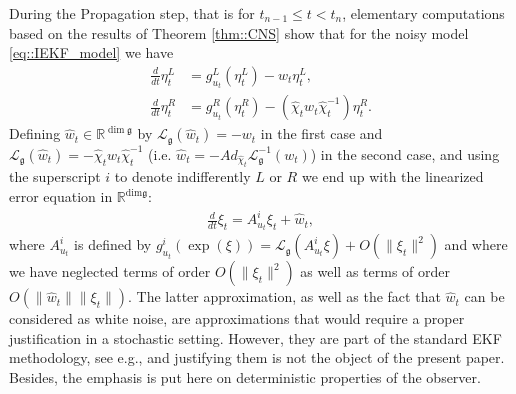 \documentclass[a4paper,12pt,onecolumn]{article}
\newcommand{\RR}{{\mathbb{R}}}
\newcommand{\norm}[1]{\lVert#1\rVert}
\newcommand{\dotex}{{\frac{d}{dt}}}
\begin{document}
During the Propagation step, that is for $t_{n-1}\leq t<t_n$, elementary computations based on the results of Theorem \ref{thm::CNS} show that for the noisy model \eqref{eq::IEKF_model} we have
\begin{equation}
\begin{aligned}
\dotex\eta_t^L &  = g_{u_t}^L \left( \eta_t^L \right) - w_t\eta_t^L, \\
 \dotex\eta_t^R & = g_{u_t}^R \left( \eta_t^R \right) - \left( \hat \chi_t w_t \hat \chi_t^{-1} \right) \eta_t^R.
\end{aligned}
\label{er_r:eq}
\end{equation}
Defining $\hat{w}_t \in \RR^{\dim \mathfrak{g}}$ by $\mathcal{L}_{\mathfrak{g}}(\hat{w}_t) = - w_t$ in the first case and $\mathcal{L}_{\mathfrak{g}}(\hat{w}_t) = -\hat\chi_tw_t\hat\chi_t^{-1}$ (i.e. $\hat{w}_t = - Ad_{\hat{\chi}_t} \mathcal{L}_{\mathfrak{g}}^{-1} (w_t)$) in the second case, and using the superscript $i$ to denote indifferently $L$ or $R$ we end up with the linearized error equation in $\RR^{\mathrm{dim }\mathfrak{g}}$: 
\begin{align}
\frac{d}{dt} \xi_t = A_{u_t}^i \xi_t + \hat{w}_t, \label{line:eq}
\end{align}
where $A_{u_t}^i$ is defined by $g_{u_t}^i(\exp(\xi)) = \mathcal{L}_{\mathfrak{g}}(A_{u_t}^i \xi) + O(\norm{\xi_t}^2)$  and where we have neglected terms of order $O(\norm{\xi_t}^2)$ as well as terms of order $O(\norm{\hat w_t}\norm{\xi_t})$. The latter approximation, as well as the fact that ${\hat w_t}$ can be considered as white noise, are approximations that would require a proper justification in a stochastic setting. However,   they are part of the standard EKF methodology, see e.g.,  \cite{lefferts1982kalman} and justifying them is not the object of the present paper. Besides,   the emphasis is put here on   deterministic properties of the observer. 
\end{document}
